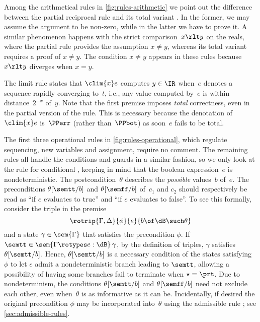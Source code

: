 Among the arithmetical rules in \cref{fig:rules-arithmetic} we point out the difference between the partial reciprocal rule  and its total variant . In the former, we may assume the argument to be non-zero, while in the latter we have to prove it.
%
A similar phenomenon happens with the strict comparison~$x \rlt y$ on the reals, where the partial rule  provides the assumption $x \neq y$, whereas its total variant  requires a proof of $x \neq y$. The condition $x \neq y$ appears in these rules because $x \rlt y$ diverges when $x = y$. 

The limit rule  states that $\clim{x} e$ computes $y \in \IR$ when~$e$ denotes a sequence rapidly converging to~$t$, i.e., any value computed by~$e$ is within distance~$2^{-x}$ of~$y$.
%
Note that the first premise imposes \emph{total} correctness, even in the partial version of the rule. This is necessary because the denotation of $\clim{x} e$ is~$\PPerr$ (rather than~$\PPbot$) as soon~$e$ fails to be total.

The first three operational rules in \cref{fig:rules-operational}, which regulate sequencing, new variables and assignment, require no comment.
%
The remaining rules all handle the conditions and guards in a similar fashion,
so we only look at the rule for conditional , keeping in mind that the boolean expression~$e$ is nondeterministic. The postcondition~$\theta$ describes the \emph{possible} values~$b$ of~$e$. The preconditions $\theta[\semtt/b]$ and $\theta[\semff/b]$ of~$c_1$ and $c_2$ should respectively be read as ``if $e$ evaluates to true'' and ``if $e$ evaluates to false''. 
To see this formally, consider the triple in the premise
\[
\rotrip {\Gamma, \Delta} {\phi} {e} {b \of \dB \such \theta}
\]
and a state $\gamma \in\sem{\Gamma}$ that satisfies the precondition $\phi$.
If $\semtt \in \sem{\Gamma \rotypes e : \dB}\,\gamma$, by the definition of triples, $\gamma$ satisfies $\theta[\semtt/b]$.
Hence, $\theta[\semtt/b]$ is a necessary condition of the states satisfying $\phi$ to let $e$ admit a nondeterministic branch leading to $\semtt$,  allowing a possibility of having some branches fail to terminate when $\star = \prt$.
Due to nondeterminism, the conditions $\theta[\semtt/b]$ and $\theta[\semff/b]$ need not exclude each other, even when~$\theta$ is as informative as it can be.
%
Incidentally, if desired the original precondition $\phi$ may be incorporated into~$\theta$ using the admissible rule ; see \cref{sec:admissible-rules}.


